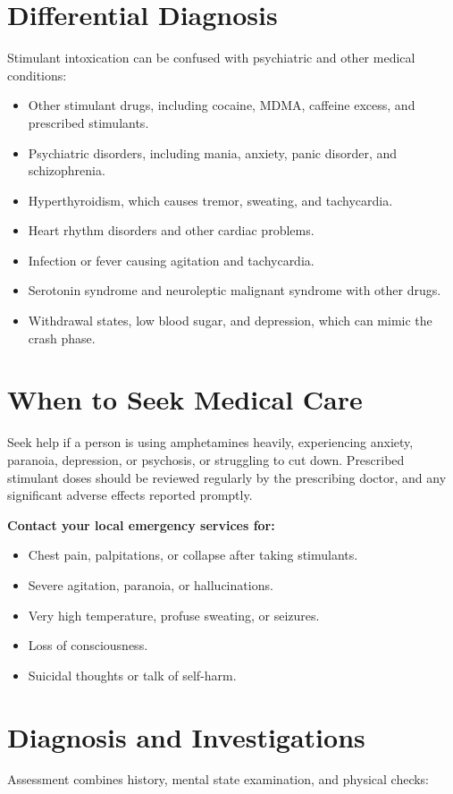 \section*{Differential Diagnosis}
Stimulant intoxication can be confused with psychiatric and other medical conditions:

\begin{itemize}
    \item Other stimulant drugs, including cocaine, MDMA, caffeine excess, and prescribed stimulants.
    \item Psychiatric disorders, including mania, anxiety, panic disorder, and schizophrenia.
    \item Hyperthyroidism, which causes tremor, sweating, and tachycardia.
    \item Heart rhythm disorders and other cardiac problems.
    \item Infection or fever causing agitation and tachycardia.
    \item Serotonin syndrome and neuroleptic malignant syndrome with other drugs.
    \item Withdrawal states, low blood sugar, and depression, which can mimic the crash phase.
\end{itemize}

\section*{When to Seek Medical Care}
Seek help if a person is using amphetamines heavily, experiencing anxiety, paranoia, depression, or psychosis, or struggling to cut down. Prescribed stimulant doses should be reviewed regularly by the prescribing doctor, and any significant adverse effects reported promptly.

\textbf{Contact your local emergency services for:}
\begin{itemize}
    \item Chest pain, palpitations, or collapse after taking stimulants.
    \item Severe agitation, paranoia, or hallucinations.
    \item Very high temperature, profuse sweating, or seizures.
    \item Loss of consciousness.
    \item Suicidal thoughts or talk of self-harm.
\end{itemize}

\section*{Diagnosis and Investigations}
Assessment combines history, mental state examination, and physical checks:

